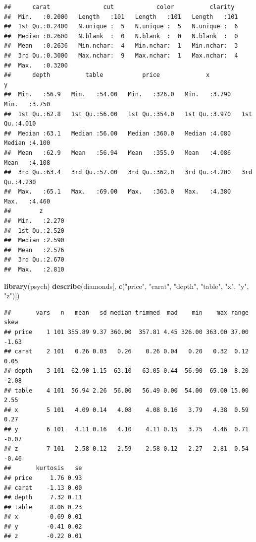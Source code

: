 \documentclass[
]{article}
\newenvironment{Shaded}{\begin{snugshade}}{\end{snugshade}}
\newcommand{\FunctionTok}[1]{\textcolor[rgb]{0.13,0.29,0.53}{\textbf{#1}}}
\newcommand{\NormalTok}[1]{#1}
\newcommand{\StringTok}[1]{\textcolor[rgb]{0.31,0.60,0.02}{#1}}
\begin{document}
\begin{verbatim}
##      carat               cut            color          clarity   
##  Min.   :0.2000   Length   :101   Length   :101   Length   :101  
##  1st Qu.:0.2400   N.unique :  5   N.unique :  5   N.unique :  6  
##  Median :0.2600   N.blank  :  0   N.blank  :  0   N.blank  :  0  
##  Mean   :0.2636   Min.nchar:  4   Min.nchar:  1   Min.nchar:  3  
##  3rd Qu.:0.3000   Max.nchar:  9   Max.nchar:  1   Max.nchar:  4  
##  Max.   :0.3200                                                  
##      depth          table           price             x               y        
##  Min.   :56.9   Min.   :54.00   Min.   :326.0   Min.   :3.790   Min.   :3.750  
##  1st Qu.:62.8   1st Qu.:56.00   1st Qu.:354.0   1st Qu.:3.970   1st Qu.:4.010  
##  Median :63.1   Median :56.00   Median :360.0   Median :4.080   Median :4.100  
##  Mean   :62.9   Mean   :56.94   Mean   :355.9   Mean   :4.086   Mean   :4.108  
##  3rd Qu.:63.4   3rd Qu.:57.00   3rd Qu.:362.0   3rd Qu.:4.200   3rd Qu.:4.230  
##  Max.   :65.1   Max.   :69.00   Max.   :363.0   Max.   :4.380   Max.   :4.460  
##        z        
##  Min.   :2.270  
##  1st Qu.:2.520  
##  Median :2.590  
##  Mean   :2.576  
##  3rd Qu.:2.670  
##  Max.   :2.810
\end{verbatim}

\begin{Shaded}
\begin{Highlighting}[]
\FunctionTok{library}\NormalTok{(psych)}
\FunctionTok{describe}\NormalTok{(diamonds[, }\FunctionTok{c}\NormalTok{(}\StringTok{"price"}\NormalTok{, }\StringTok{"carat"}\NormalTok{, }\StringTok{"depth"}\NormalTok{, }\StringTok{"table"}\NormalTok{, }\StringTok{"x"}\NormalTok{, }\StringTok{"y"}\NormalTok{, }\StringTok{"z"}\NormalTok{)])}
\end{Highlighting}
\end{Shaded}

\begin{verbatim}
##       vars   n   mean   sd median trimmed  mad    min    max range  skew
## price    1 101 355.89 9.37 360.00  357.81 4.45 326.00 363.00 37.00 -1.63
## carat    2 101   0.26 0.03   0.26    0.26 0.04   0.20   0.32  0.12  0.05
## depth    3 101  62.90 1.15  63.10   63.05 0.44  56.90  65.10  8.20 -2.08
## table    4 101  56.94 2.26  56.00   56.49 0.00  54.00  69.00 15.00  2.55
## x        5 101   4.09 0.14   4.08    4.08 0.16   3.79   4.38  0.59  0.27
## y        6 101   4.11 0.16   4.10    4.11 0.15   3.75   4.46  0.71 -0.07
## z        7 101   2.58 0.12   2.59    2.58 0.12   2.27   2.81  0.54 -0.46
##       kurtosis   se
## price     1.76 0.93
## carat    -1.13 0.00
## depth     7.32 0.11
## table     8.06 0.23
## x        -0.69 0.01
## y        -0.41 0.02
## z        -0.22 0.01
\end{verbatim}
\end{document}
